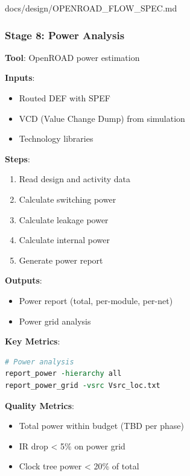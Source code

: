 \begin{relocated}{docs/design/OPENROAD_FLOW_SPEC.md}
\subsubsection{Stage 8: Power Analysis}\label{tm:pd:openroad-flow:stage-8-power-analysis}

\textbf{Tool}: OpenROAD power estimation

\textbf{Inputs}:

\begin{itemize}
\tightlist
\item
  Routed DEF with SPEF
\item
  VCD (Value Change Dump) from simulation
\item
  Technology libraries
\end{itemize}

\textbf{Steps}:

\begin{enumerate}
\def\labelenumi{\arabic{enumi}.}
\tightlist
\item
  Read design and activity data
\item
  Calculate switching power
\item
  Calculate leakage power
\item
  Calculate internal power
\item
  Generate power report
\end{enumerate}

\textbf{Outputs}:

\begin{itemize}
\tightlist
\item
  Power report (total, per-module, per-net)
\item
  Power grid analysis
\end{itemize}

\textbf{Key Metrics}:

\begin{lstlisting}[language=tcl]
# Power analysis
report_power -hierarchy all
report_power_grid -vsrc Vsrc_loc.txt
\end{lstlisting}

\textbf{Quality Metrics}:

\begin{itemize}
\tightlist
\item
  Total power within budget (TBD per phase)
\item
  IR drop \textless{} 5\% on power grid
\item
  Clock tree power \textless{} 20\% of total
\end{itemize}


\end{relocated}
